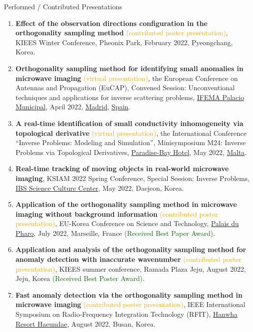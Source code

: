 \documentclass{resume} %
\begin{document}
\begin{rSection}{Performed / Contributed Presentations}
\begin{enumerate}
\item\label{P-KIEES2022B} \textbf{Effect of the observation directions configuration in the orthogonality sampling method} \textcolor{orange}{(contributed poster presentation)}, KIEES Winter Conference, Pheonix Park, February 2022, Pyeongchang, Korea.
\item\label{P-EUCAP2022} \textbf{Orthogonality sampling method for identifying small anomalies in microwave imaging} \textcolor{orange}{(virtual presentation)}, the  European Conference on Antennas and Propagation (EuCAP), Convened Session: Unconventional techniques and applications for inverse scattering problems, \href{https://www.ifema.es/en}{IFEMA Palacio Municipal}, April 2022, \href{https://www.esmadrid.com/en}{Madrid}, \href{https://www.spain.info}{Spain}.
\item\label{P-IPMS2022} \textbf{A real-time identification of small conductivity inhomogeneity via topological derivative} \textcolor{orange}{(virtual presentation)}, the  International Conference ``Inverse Problems: Modeling and Simulation'', Minisymposium M24: Inverse Problems via Topological Derivatives, \href{https://www.paradise-bay.com/en}{Paradise-Bay Hotel}, May 2022, \href{https://www.visitmalta.com/en/island-of-malta}{Malta}.
\item\label{P-KSIAM2022} \textbf{Real-time tracking of moving objects in real-world microwave imaging}, KSIAM 2022 Spring Conference, Special Session: Inverse Problems, \href{https://www.ibs.re.kr/scc/main.do}{IBS Science Culture Center}, May 2022, Daejeon, Korea.
\item\label{P-EKC2022} \textbf{Application of the orthogonality sampling method in microwave imaging without background information} \textcolor{orange}{(contributed poster presentation)}, EU-Korea Conference on Science and Technology, \href{https://palaisdupharo.marseille.fr}{Palais du Pharo}, July 2022, Marseille, France \textcolor{darkgreen}{(Received Best Paper Award)}.
\item\label{P-KIEES2022C} \textbf{Application and analysis of the orthogonality sampling method for anomaly detection with inaccurate wavenumber} \textcolor{orange}{(contributed poster presentation)}, KIEES summer conference,  Ramada Plaza Jeju, August 2022, Jeju, Korea \textcolor{darkgreen}{(Received Best Poster Award)}.
\item\label{P-RFIT2022} \textbf{Fast anomaly detection via the orthogonality sampling method in microwave imaging} \textcolor{orange}{(contributed poster presentation)}, IEEE International Symposium on Radio-Frequency Integration Technology (RFIT), \href{https://hanwha-resort-haeundae.busan-hotel.com/en/}{Hanwha Resort Haeundae}, August 2022, Busan, Korea.

\end{enumerate}
\end{rSection}
\end{document}
